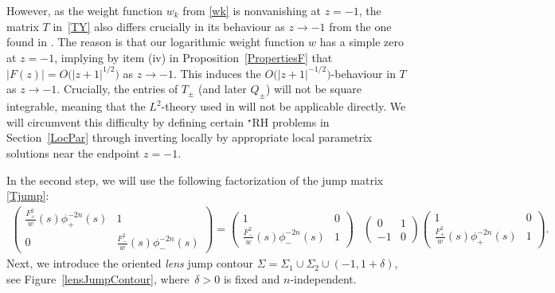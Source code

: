 However, as the weight function $w_k$ from \eqref{wk} is nonvanishing at $z = -1$, the matrix $T$ in~\eqref{TY} also differs crucially in its behaviour as $z\to-1$ from the one found in \cite[equation~(3.7)]{CD}. The reason is that our logarithmic weight function $w$ has a simple zero at $z=-1$, implying by item (iv) in Proposition~\ref{PropertiesF} that $|F(z)| = O\big(|z+1|^{1/2}\big)$ as $z \to -1$. This induces the $O\big(|z+1|^{-1/2}\big)$-behaviour in $T$ as $z\to-1$. Crucially, the entries of $T_\pm$ (and later $Q_\pm$) will not be square integrable, meaning that the $L^2$-theory used in \cite{CD} will not be applicable directly. We will circumvent this difficulty by defining certain ${}^\star$RH problems in Section~\ref{LocPar} through inverting locally by appropriate local parametrix solutions near the endpoint $z = -1$.

In the second step, we will use the following factorization of the jump matrix \eqref{Tjump}:
\begin{align*}
 \begin{pmatrix}
 \frac{F_+^2}{w}(s)\phi_+^{-2n}(s) & 1
 \\
 0 & \frac{F_-^2}{w}(s)\phi_-^{-2n}(s)
 \end{pmatrix} = \begin{pmatrix}
 1 & 0
 \\
 \frac{F_-^2}{w}(s)\phi_-^{-2n}(s) & 1
 \end{pmatrix}&
 \begin{pmatrix}
 0 & 1
 \\
 -1 & 0
 \end{pmatrix}
 \begin{pmatrix}
 1 & 0
 \\
 \frac{F_+^2}{w}(s)\phi_+^{-2n}(s) & 1
 \end{pmatrix}.
\end{align*}
Next, we introduce the oriented \emph{lens} jump contour $\Sigma = \Sigma_1 \cup \Sigma_2 \cup (-1,1+\delta)$, see Figure~\ref{lensJumpContour}, where~$\delta > 0$ is fixed and $n$-independent.

